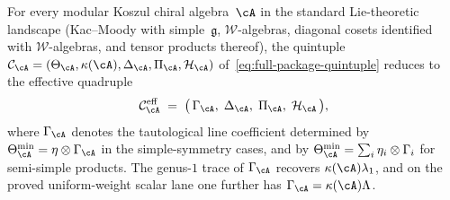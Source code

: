 \begin{corollary}
\label{cor:effective-quadruple}
For every modular Koszul chiral algebra~$\cA$ in the
standard Lie-theoretic landscape
\textup{(}Kac--Moody with simple~$\mathfrak{g}$,
$\mathcal{W}$-algebras, diagonal cosets identified with
$\mathcal{W}$-algebras, and tensor products thereof\textup{)},
the quintuple
$\mathcal{C}_{\cA} = (\Theta_{\cA}, \kappa(\cA),
\Delta_{\cA}, \Pi_{\cA}, \mathcal{H}_{\cA})$
of~\eqref{eq:full-package-quintuple} reduces to the effective
quadruple
\begin{equation}\label{eq:reduced-quadruple}
\mathcal{C}_{\cA}^{\mathrm{eff}}
\;=\; \bigl(\,\Gamma_{\cA},\;\Delta_{\cA},\;
       \Pi_{\cA},\;\mathcal{H}_{\cA}\,\bigr),
\end{equation}
where $\Gamma_{\cA}$ denotes the tautological line coefficient
determined by
$\Theta_{\cA}^{\min} = \eta \otimes \Gamma_{\cA}$ in the
simple-symmetry cases, and by
$\Theta_{\cA}^{\min} = \sum_i \eta_i \otimes \Gamma_i$ for
semi-simple products.  The genus-$1$ trace of $\Gamma_{\cA}$
recovers $\kappa(\cA)\lambda_1$, and on the proved
uniform-weight scalar lane one further has
$\Gamma_{\cA} = \kappa(\cA)\Lambda$.
\end{corollary}

